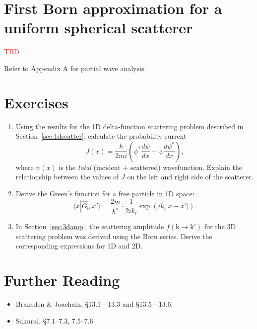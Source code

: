 \documentclass[pra,12pt]{revtex4}
\begin{document}
\section{First Born approximation for a uniform spherical scatterer}

\textcolor{red}{TBD}

Refer to Appendix A for partial wave analysis.


\section*{Exercises}

\begin{enumerate}
\item Using the results for the 1D delta-function scattering problem
  described in Section~\ref{sec:1dscatter}, calculate the probability
  current
  $$J(x) = \frac{\hbar}{2mi}\left(\psi^*\frac{d\psi}{dx} - \psi\frac{d\psi^*}{dx}\right),$$
  where $\psi(x)$ is the \textit{total} (incident + scattered)
  wavefunction.  Explain the relationship between the values of $J$ on
  the left and right side of the scatterer.

\item Derive the Green's function for a free particle in 1D space:
  $$\langle x|\hat{G}_0|x'\rangle = \frac{2m}{\hbar^2} \cdot \frac{1}{2ik_i} \exp\left(ik_i|x-x'|\right).$$

\item In Section~\ref{sec:3damp}, the scattering amplitude
  $f(\mathrm{k}\rightarrow\mathrm{k}')$ for the 3D scattering problem
  was derived using the Born series.  Derive the corresponding
  expressions for 1D and 2D.
\end{enumerate}


\section*{Further Reading}

\begin{itemize}
\item Bransden \& Joachain, \S13.1---13.3 and \S13.5---13.6.
\item Sakurai, \S7.1--7.3, 7.5--7.6

\end{itemize}
\end{document}
